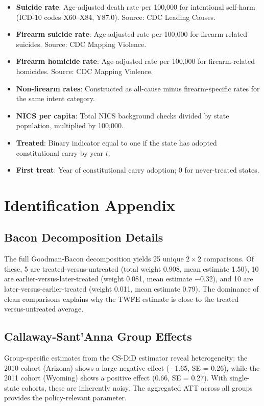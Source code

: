 \documentclass[12pt]{article}
\begin{document}
\begin{itemize}
\item \textbf{Suicide rate}: Age-adjusted death rate per 100,000 for intentional self-harm (ICD-10 codes X60--X84, Y87.0). Source: CDC Leading Causes.
\item \textbf{Firearm suicide rate}: Age-adjusted rate per 100,000 for firearm-related suicides. Source: CDC Mapping Violence.
\item \textbf{Firearm homicide rate}: Age-adjusted rate per 100,000 for firearm-related homicides. Source: CDC Mapping Violence.
\item \textbf{Non-firearm rates}: Constructed as all-cause minus firearm-specific rates for the same intent category.
\item \textbf{NICS per capita}: Total NICS background checks divided by state population, multiplied by 100,000.
\item \textbf{Treated}: Binary indicator equal to one if the state has adopted constitutional carry by year $t$.
\item \textbf{First treat}: Year of constitutional carry adoption; 0 for never-treated states.
\end{itemize}


\section{Identification Appendix}\label{app:ident}

\subsection{Bacon Decomposition Details}

The full Goodman-Bacon decomposition yields 25 unique $2 \times 2$ comparisons. Of these, 5 are treated-versus-untreated (total weight 0.908, mean estimate 1.50), 10 are earlier-versus-later-treated (weight 0.081, mean estimate $-$0.32), and 10 are later-versus-earlier-treated (weight 0.011, mean estimate 0.79). The dominance of clean comparisons explains why the TWFE estimate is close to the treated-versus-untreated average.

\subsection{Callaway-Sant'Anna Group Effects}

Group-specific estimates from the CS-DiD estimator reveal heterogeneity: the 2010 cohort (Arizona) shows a large negative effect ($-$1.65, SE = 0.26), while the 2011 cohort (Wyoming) shows a positive effect (0.66, SE = 0.27). With single-state cohorts, these are inherently noisy. The aggregated ATT across all groups provides the policy-relevant parameter.
\end{document}
